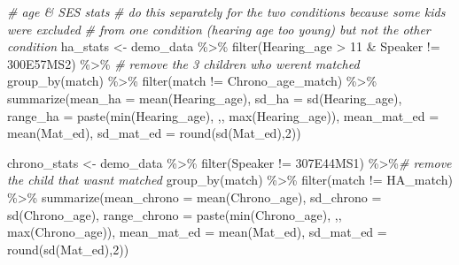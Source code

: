 \documentclass[
]{article}
\newenvironment{Shaded}{\begin{snugshade}}{\end{snugshade}}
\newcommand{\AttributeTok}[1]{\textcolor[rgb]{0.77,0.63,0.00}{#1}}
\newcommand{\CommentTok}[1]{\textcolor[rgb]{0.56,0.35,0.01}{\textit{#1}}}
\newcommand{\DecValTok}[1]{\textcolor[rgb]{0.00,0.00,0.81}{#1}}
\newcommand{\FunctionTok}[1]{\textcolor[rgb]{0.00,0.00,0.00}{#1}}
\newcommand{\NormalTok}[1]{#1}
\newcommand{\OtherTok}[1]{\textcolor[rgb]{0.56,0.35,0.01}{#1}}
\newcommand{\SpecialCharTok}[1]{\textcolor[rgb]{0.00,0.00,0.00}{#1}}
\newcommand{\StringTok}[1]{\textcolor[rgb]{0.31,0.60,0.02}{#1}}
\begin{document}
\begin{Shaded}
\begin{Highlighting}[]
\CommentTok{\# age \& SES stats}
\CommentTok{\# do this separately for the two conditions because some kids were excluded }
\CommentTok{\# from one condition (hearing age too young) but not the other condition}
\NormalTok{ha\_stats }\OtherTok{\textless{}{-}}\NormalTok{ demo\_data }\SpecialCharTok{\%\textgreater{}\%}
  \FunctionTok{filter}\NormalTok{(Hearing\_age }\SpecialCharTok{\textgreater{}} \DecValTok{11} \SpecialCharTok{\&}\NormalTok{ Speaker }\SpecialCharTok{!=} \StringTok{\textquotesingle{}300E57MS2\textquotesingle{}}\NormalTok{) }\SpecialCharTok{\%\textgreater{}\%} \CommentTok{\# remove the 3 children who weren\textquotesingle{}t matched}
  \FunctionTok{group\_by}\NormalTok{(match) }\SpecialCharTok{\%\textgreater{}\%} 
  \FunctionTok{filter}\NormalTok{(match }\SpecialCharTok{!=} \StringTok{\textquotesingle{}Chrono\_age\_match\textquotesingle{}}\NormalTok{) }\SpecialCharTok{\%\textgreater{}\%}
  \FunctionTok{summarize}\NormalTok{(}\AttributeTok{mean\_ha =} \FunctionTok{mean}\NormalTok{(Hearing\_age),}
            \AttributeTok{sd\_ha =} \FunctionTok{sd}\NormalTok{(Hearing\_age),}
            \AttributeTok{range\_ha =} \FunctionTok{paste}\NormalTok{(}\FunctionTok{min}\NormalTok{(Hearing\_age), }\StringTok{\textquotesingle{},\textquotesingle{}}\NormalTok{, }\FunctionTok{max}\NormalTok{(Hearing\_age)),}
            \AttributeTok{mean\_mat\_ed =} \FunctionTok{mean}\NormalTok{(Mat\_ed),}
            \AttributeTok{sd\_mat\_ed =} \FunctionTok{round}\NormalTok{(}\FunctionTok{sd}\NormalTok{(Mat\_ed),}\DecValTok{2}\NormalTok{))}

\NormalTok{chrono\_stats }\OtherTok{\textless{}{-}}\NormalTok{ demo\_data }\SpecialCharTok{\%\textgreater{}\%}
  \FunctionTok{filter}\NormalTok{(Speaker }\SpecialCharTok{!=} \StringTok{\textquotesingle{}307E44MS1\textquotesingle{}}\NormalTok{) }\SpecialCharTok{\%\textgreater{}\%}\CommentTok{\# remove the child that wasn\textquotesingle{}t matched}
  \FunctionTok{group\_by}\NormalTok{(match) }\SpecialCharTok{\%\textgreater{}\%} 
  \FunctionTok{filter}\NormalTok{(match }\SpecialCharTok{!=} \StringTok{\textquotesingle{}HA\_match\textquotesingle{}}\NormalTok{) }\SpecialCharTok{\%\textgreater{}\%}
  \FunctionTok{summarize}\NormalTok{(}\AttributeTok{mean\_chrono =} \FunctionTok{mean}\NormalTok{(Chrono\_age),}
            \AttributeTok{sd\_chrono =} \FunctionTok{sd}\NormalTok{(Chrono\_age),}
            \AttributeTok{range\_chrono =} \FunctionTok{paste}\NormalTok{(}\FunctionTok{min}\NormalTok{(Chrono\_age), }\StringTok{\textquotesingle{},\textquotesingle{}}\NormalTok{, }\FunctionTok{max}\NormalTok{(Chrono\_age)),}
            \AttributeTok{mean\_mat\_ed =} \FunctionTok{mean}\NormalTok{(Mat\_ed),}
            \AttributeTok{sd\_mat\_ed =} \FunctionTok{round}\NormalTok{(}\FunctionTok{sd}\NormalTok{(Mat\_ed),}\DecValTok{2}\NormalTok{))}
\end{Highlighting}
\end{Shaded}
\end{document}
